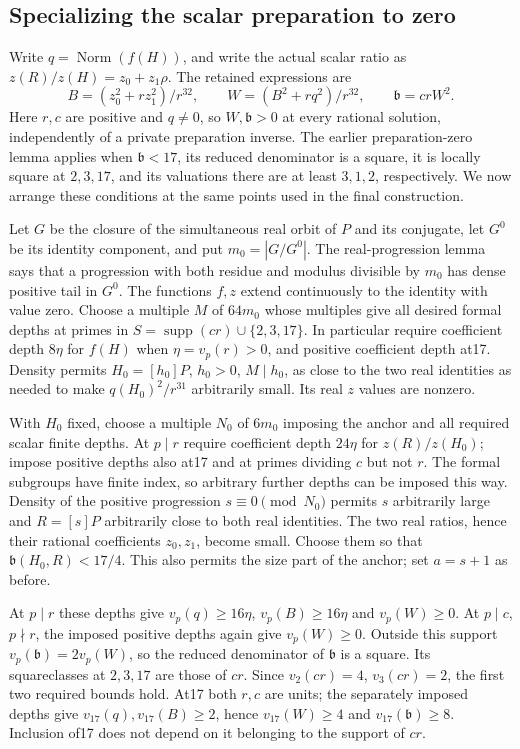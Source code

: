 \subsection{Specializing the scalar preparation to zero}
Write $q=\operatorname{Norm}(f(H))$, and write the actual scalar ratio as
$z(R)/z(H)=z_0+z_1\rho$. The retained expressions are
\[
 B=(z_0^2+rz_1^2)/r^{32},\qquad
 W=(B^2+rq^2)/r^{32},\qquad \mathfrak b=crW^2.
\]
Here $r,c$ are positive and $q\ne0$, so $W,\mathfrak b>0$ at every
rational solution, independently of a private preparation inverse.
The earlier preparation-zero lemma applies when $\mathfrak b<17$, its
reduced denominator is a square, it is locally square at $2,3,17$, and
its valuations there are at least $3,1,2$, respectively. We now arrange
these conditions at the same points used in the final construction.

Let $G$ be the closure of the simultaneous real orbit of $P$ and its
conjugate, let $G^0$ be its identity component, and put $m_0=|G/G^0|$.
The real-progression lemma says that a progression with both residue
and modulus divisible by $m_0$ has dense positive tail in $G^0$.
The functions $f,z$ extend continuously to the identity with value zero.
Choose a multiple $M$ of $64m_0$ whose multiples give all desired formal
depths at primes in $S=\operatorname{supp}(cr)\cup\{2,3,17\}$.
In particular require coefficient depth $8\eta$ for $f(H)$ when
$\eta=v_p(r)>0$, and positive coefficient depth at17. Density permits
$H_0=[h_0]P$, $h_0>0$, $M\mid h_0$, as close to the two real identities
as needed to make $q(H_0)^2/r^{31}$ arbitrarily small.
Its real $z$ values are nonzero.

With $H_0$ fixed, choose a multiple $N_0$ of $6m_0$ imposing the anchor
and all required scalar finite depths. At $p\mid r$ require coefficient
depth $24\eta$ for $z(R)/z(H_0)$; impose positive depths also at17 and
at primes dividing $c$ but not $r$. The formal subgroups have finite
index, so arbitrary further depths can be imposed this way. Density of
the positive progression $s\equiv0\pmod{N_0}$ permits $s$ arbitrarily
large and $R=[s]P$ arbitrarily close to both real identities. The two
real ratios, hence their rational coefficients $z_0,z_1$, become small.
Choose them so that $\mathfrak b(H_0,R)<17/4$. This also permits the
size part of the anchor; set $a=s+1$ as before.

At $p\mid r$ these depths give $v_p(q)\ge16\eta$,
$v_p(B)\ge16\eta$ and $v_p(W)\ge0$. At $p\mid c$, $p\nmid r$,
the imposed positive depths again give $v_p(W)\ge0$. Outside this
support $v_p(\mathfrak b)=2v_p(W)$, so the reduced denominator of
$\mathfrak b$ is a square. Its squareclasses at $2,3,17$ are those of
$cr$. Since $v_2(cr)=4$, $v_3(cr)=2$, the first two required bounds
hold. At17 both $r,c$ are units; the separately imposed depths give
$v_{17}(q),v_{17}(B)\ge2$, hence $v_{17}(W)\ge4$ and
$v_{17}(\mathfrak b)\ge8$. Inclusion of17 does not depend on it
belonging to the support of $cr$.

